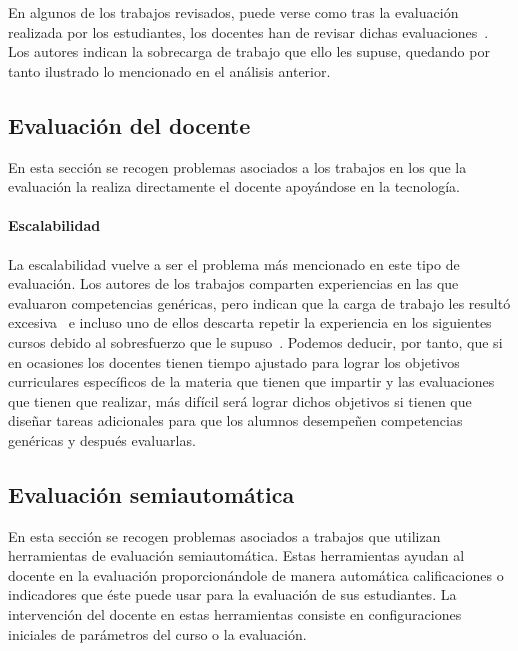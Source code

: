 En algunos de los trabajos revisados, puede verse como tras la evaluación realizada por los estudiantes, los docentes han de revisar dichas evaluaciones~\cite{lasa2013problem,sevilla2012assessment}. Los autores indican la sobrecarga de trabajo que ello les supuse, quedando por tanto ilustrado lo mencionado en el análisis anterior. %

\subsection*{Evaluación del docente}

En esta sección se recogen problemas asociados a los trabajos en los que la evaluación la realiza directamente el docente apoyándose en la tecnología.

\paragraph*{Escalabilidad}
La escalabilidad vuelve a ser el problema más mencionado en este tipo de evaluación. Los autores de los trabajos comparten experiencias en las que evaluaron competencias genéricas, pero indican que la carga de trabajo les resultó excesiva~\cite{serrano2013hiperion,lacuesta2009active} e incluso uno de ellos descarta repetir la experiencia en los siguientes cursos debido al sobresfuerzo que le supuso~\cite{benlloch2007adapting}. Podemos deducir, por tanto, que si en ocasiones los docentes tienen tiempo ajustado para lograr los objetivos curriculares específicos de la materia que tienen que impartir y las evaluaciones que tienen que realizar, más difícil será lograr dichos objetivos si tienen que diseñar tareas adicionales para que los alumnos desempeñen competencias genéricas y después evaluarlas.

\subsection{Evaluación semiautomática}

En esta sección se recogen problemas asociados a trabajos que utilizan herramientas de evaluación semiautomática. Estas herramientas ayudan al docente en la evaluación proporcionándole de manera automática calificaciones o indicadores que éste puede usar para la evaluación de sus estudiantes. La intervención del docente en estas herramientas consiste en configuraciones iniciales de parámetros del curso o la evaluación.

